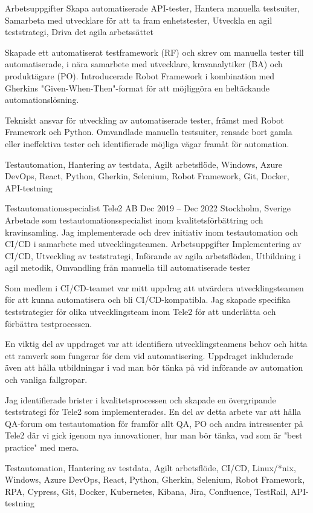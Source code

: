 \documentclass{sobCV}[2015/09/08]
\begin{document}
   {Arbetsuppgifter}{
       Skapa automatiserade API-tester, 
       Hantera manuella testsuiter,
       Samarbeta med utvecklare för att ta fram enhetstester,
       Utveckla en agil teststrategi,
       Driva det agila arbetssättet
 }{
      {
          Skapade ett automatiserat testframework (RF) och skrev om manuella tester till automatiserade, i nära samarbete med utvecklare, kravanalytiker (BA) och produktägare (PO). Introducerade Robot Framework i kombination med Gherkins "Given-When-Then"-format för att möjliggöra en heltäckande automationslösning.

         Tekniskt ansvar för utveckling av automatiserade tester, främst med Robot Framework och Python. Omvandlade manuella testsuiter, rensade bort gamla eller ineffektiva tester och identifierade möjliga vägar framåt för automation.
     }
 }{
       Testautomation,
       Hantering av testdata,
       Agilt arbetsflöde, 
       Windows, 
       Azure DevOps, 
       React, 
       Python, 
       Gherkin, 
       Selenium, 
       Robot Framework,
       Git, 
       Docker, 
       API-testning 
}

\experiencenode
   {Testautomationsspecialist}
   {Tele2 AB}
    {Dec 2019 -- Dec 2022}
   {Stockholm, Sverige}{
       Arbetade som testautomationsspecialist inom kvalitetsförbättring och kravinsamling. Jag implementerade och drev initiativ inom testautomation och CI/CD i samarbete med utvecklingsteamen.
   }
   {Arbetsuppgifter}{
      Implementering av CI/CD,
      Utveckling av teststrategi, 
      Införande av agila arbetsflöden,
      Utbildning i agil metodik,
      Omvandling från manuella till automatiserade tester
   }{
        {
           Som medlem i CI/CD-teamet var mitt uppdrag att utvärdera utvecklingsteamen för att kunna automatisera och bli CI/CD-kompatibla. Jag skapade specifika teststrategier för olika utvecklingsteam inom Tele2 för att underlätta och förbättra testprocessen.
       }

        {
           En viktig del av uppdraget var att identifiera utvecklingsteamens behov och hitta ett ramverk som fungerar för dem vid automatisering. Uppdraget inkluderade även att hålla utbildningar i vad man bör tänka på vid införande av automation och vanliga fallgropar.
       }

        {
           Jag identifierade brister i kvalitetsprocessen och skapade en övergripande teststrategi för Tele2 som implementerades. En del av detta arbete var att hålla QA-forum om testautomation för framför allt QA, PO och andra intressenter på Tele2 där vi gick igenom nya innovationer, hur man bör tänka, vad som är "best practice" med mera.
       }
   }{
       Testautomation,
       Hantering av testdata,
       Agilt arbetsflöde, 
       CI/CD, 
       Linux/*nix, 
       Windows, 
       Azure DevOps, 
       React, 
       Python, 
       Gherkin, 
       Selenium, 
       Robot Framework,
       RPA,
       Cypress, 
       Git, 
       Docker, 
       Kubernetes, 
       Kibana, 
       Jira, 
       Confluence, 
       TestRail, 
       API-testning 
   }
\end{document}
